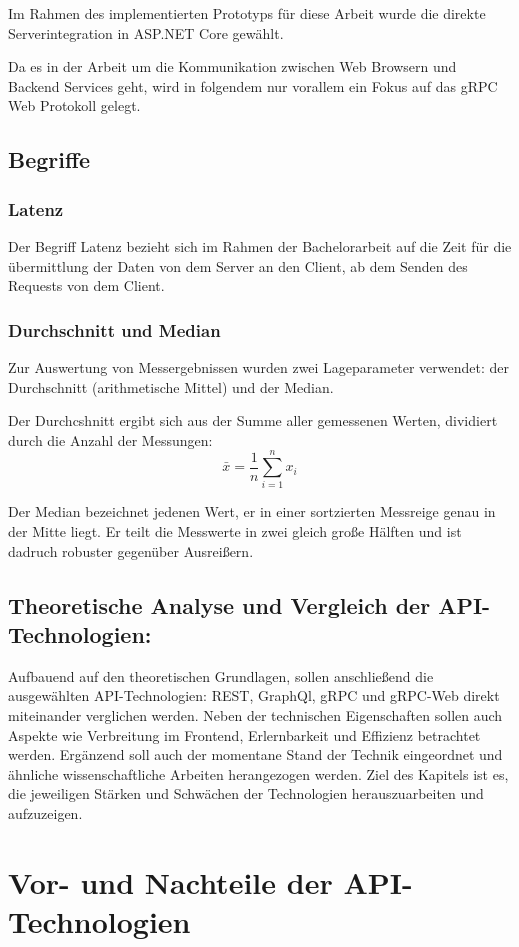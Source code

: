 Im Rahmen des implementierten Prototyps für diese Arbeit wurde die direkte Serverintegration in ASP.NET Core gewählt.

Da es in der Arbeit um die Kommunikation zwischen Web Browsern und Backend Services geht, wird in folgendem nur vorallem ein Fokus auf das gRPC Web Protokoll gelegt.

\clearpage
\subsection{Begriffe}
\subsubsection{Latenz}
Der Begriff Latenz bezieht sich im Rahmen der Bachelorarbeit auf die Zeit für die übermittlung der Daten von dem Server an den Client, ab dem Senden des Requests von dem Client.
\subsubsection{Durchschnitt und Median}
Zur Auswertung von Messergebnissen wurden zwei Lageparameter verwendet: der Durchschnitt (arithmetische Mittel) und der Median. 

Der Durchcshnitt ergibt sich aus der Summe aller gemessenen Werten, dividiert durch die Anzahl der Messungen:
\[
\bar{x} = \frac{1}{n} \sum_{i=1}^n x_i
\]

Der Median bezeichnet jedenen Wert, er in einer sortzierten Messreige genau in der Mitte liegt. Er teilt die Messwerte in zwei gleich große Hälften und ist dadruch robuster gegenüber Ausreißern.

\clearpage
\subsection{Theoretische Analyse und Vergleich der API-Technologien:}

Aufbauend auf den theoretischen Grundlagen, sollen anschließend die ausgewählten API-Technologien: REST, GraphQl, gRPC und gRPC-Web direkt miteinander verglichen werden. Neben der technischen Eigenschaften sollen auch Aspekte wie Verbreitung im Frontend, Erlernbarkeit und Effizienz betrachtet werden. Ergänzend soll auch der momentane Stand der Technik eingeordnet und ähnliche wissenschaftliche Arbeiten herangezogen werden.
Ziel des Kapitels ist es, die jeweiligen Stärken und Schwächen der Technologien herauszuarbeiten und aufzuzeigen.


\section{Vor- und Nachteile der API-Technologien}

